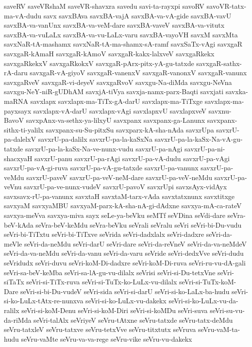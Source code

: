{saveRV
saveVRshaM
saveVR-shavxra
savedu
savi-ta-rayxpi
savoRV
savoVR-tatx-ma-vA-dudu
savx
savxBAva
savxBA-vajA
savxBA-va-vA-gide
savxBA-vavU
savxBA-va-vanUnx
savxBA-va-veM-dare
savxBA-vaveV
savxBA-va-vitutx
savxBA-va-vuLaLx
savxBA-va-vu-LaLx-varu
savxBA-vayoVH
savxM
savxMta
savxNaR-tA-mashamx
savxNaR-tA-ma-shamx-sA-ramf
savxSaTx-vAgi
savxgaR
savxgaR-kAmaH
savxgaR-kAmoV
savxgaR-kakx-lalxveV
savxgaRkekx
savxgaRkekxV
savxgaRkokxV
savxgaR-pArx-pitx-yA-gu-tatxde
savxgaR-sathx-rA-daru
savxgaR-vA-giyoV
savxgaR-vanenxV
savxgaR-vanonxV
savxgaR-vanunx
savxgaRveV
savxgaR-vi-deyeV
savxgaRvoV
savxgu-Na-diMda
savxgu-NeVna
savxgu-NeY-niR-gUDhAM
savxjA-tiVya
savxja-namx-parx-Baqti
savxjati
savxka-maRNA
savxlapx
savxlapx-ma-TiTx-gA-darU
savxlapx-ma-TiTxge
savxlapx-ma-payxsayx
savxlapx-vA-darU
savxlapx-vAgi
savxlapxvU
savxlapxveV
savxnu-BavoV
savxpAnx-va-sethx-ya-lilxyU
savxpanx
savxpanx-ga-Lanunx
savxpanx-sithx-ti-yalilx
savxpanx-su-Su-pitxSu
savxparx-kA-sha-nAda
savxrUpa
savxrU-pa-dalelxV
savxrU-pa-dalilx
savxrU-pa-la-kaSxNa
savxrU-pa-la-kaSx-Na-vA-gu-tatxde
savxrU-pa-la-kaSx-Na-ve-nunx-vudu
savxrU-pa-nAgi
savxrU-pa-ni-shacxyaH
savxrU-panu
savxrU-pa-rAgi
savxrU-pa-vA-dudu
savxrU-pa-vAgi
savxrU-pa-vA-gi-ruva
savxrU-pa-vA-gu-tatxde
savxrU-pa-vanunx
savxrU-pa-veMdu
savxrU-paveV
savxrU-pa-veV-neM-dare
savxrU-pa-veV-neMdu
savxrU-pa-veVnu
savxrU-pa-ve-nunx-vudeV
savxrU-pavoV
savxrUpi
savxsAyx-vidAyx
savxsavx-rU-pa-vanunx
savxtaH
savxtaM-tarx-vAda
savxtatxnunx
savxtitxge
savxyaM
savxyaMBU
savxyaM-parx-kA-sha-nA-gi-dAdxne
savxya-mA-ca-rateV
savxya-meVva
savxya-miva
sayx
seLe-ya-beVku
seMTf
seVDina
seVdi-dare
seVra-beV-kAda
seVra-beV-keMdu
seVra-beVku
seVrali
seVralu
seVri
seVri-bi-Du-vudu
seVri-bi-TiTxtu
seVri-bi-TiTxve
seVrida
seVri-dadxlalx
seVri-dadxre
seVri-da-meVle
seVri-da-neMdu
seVri-darU
seVri-dare
seVri-da-reVneV
seVri-da-va-neMdeV
seVri-da-va-neMdu
seVri-da-vanu
seVri-da-varu
seVride
seVri-dedxVve
seVri-dudu
seVridudx
seVri-duvu
seVri-koM-Di-dadxre
seVri-koM-Di-ruva
seVri-ru-vu-dA-gali
seVri-sa-beV-keMba
seVri-sa-lA-gu-vu-dilalx
seVrisi
seVri-si-Du-tetxVne
seVri-siTaTx
seVri-si-TiTx-ruva
seVri-si-TuTx-ko-LuLx-vu-dilalx
seVri-si-TuTx-koM-Dare
seVri-si-bi-Du-vudeV
seVri-sida
seVri-si-darU
seVri-si-ko-LaLx-ba-hudu
seVri-si-ko-LuLx-tAtx-re-nunxva
seVri-si-ko-LuLx-vu-dakekx
seVri-si-ko-LuLx-vu-da-ralilx
seVri-si-koM-Denu
seVri-si-koM-Diri
seVri-si-koMDu
seVri-suva
seVri-su-vu-da-riMda
seVri-talAlx
seVriyeV
seVru-tAtxne
seVru-tatxde
seVru-tatx-deMdu
seVru-tatxleV
seVru-tatxve
seVru-tetxVve
seVru-titxtutx
seVruva
seVru-vaM-ta-hudu
seVru-vaMte
seVru-va-va-rege
seVru-vike
seVru-vu-dakekx
}
